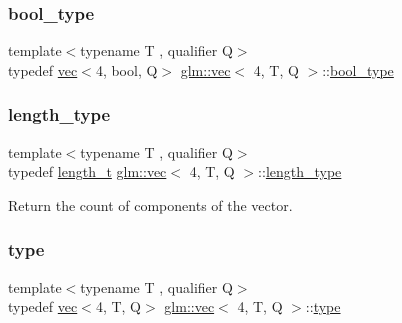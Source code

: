 \subsubsection{\texorpdfstring{bool\+\_\+type}{bool\_type}}
{\footnotesize\ttfamily template$<$typename T , qualifier Q$>$ \\
typedef \mbox{\hyperlink{structglm_1_1vec}{vec}}$<$4, bool, Q$>$ \mbox{\hyperlink{structglm_1_1vec}{glm\+::vec}}$<$ 4, T, Q $>$\+::\mbox{\hyperlink{structglm_1_1vec_3_014_00_01_t_00_01_q_01_4_a175b3fdeb819aab912118ac1605b675b}{bool\+\_\+type}}}

\mbox{\label{structglm_1_1vec_3_014_00_01_t_00_01_q_01_4_af1c8f56963141951f4a4724b47e072d9}} 
\subsubsection{\texorpdfstring{length\+\_\+type}{length\_type}}
{\footnotesize\ttfamily template$<$typename T , qualifier Q$>$ \\
typedef \mbox{\hyperlink{namespaceglm_a090a0de2260835bee80e71a702492ed9}{length\+\_\+t}} \mbox{\hyperlink{structglm_1_1vec}{glm\+::vec}}$<$ 4, T, Q $>$\+::\mbox{\hyperlink{structglm_1_1vec_3_014_00_01_t_00_01_q_01_4_af1c8f56963141951f4a4724b47e072d9}{length\+\_\+type}}}



Return the count of components of the vector. 

\mbox{\label{structglm_1_1vec_3_014_00_01_t_00_01_q_01_4_ab2b893dfe27b0d0f154d66315f35de47}} 
\subsubsection{\texorpdfstring{type}{type}}
{\footnotesize\ttfamily template$<$typename T , qualifier Q$>$ \\
typedef \mbox{\hyperlink{structglm_1_1vec}{vec}}$<$4, T, Q$>$ \mbox{\hyperlink{structglm_1_1vec}{glm\+::vec}}$<$ 4, T, Q $>$\+::\mbox{\hyperlink{structglm_1_1vec_3_014_00_01_t_00_01_q_01_4_ab2b893dfe27b0d0f154d66315f35de47}{type}}}

